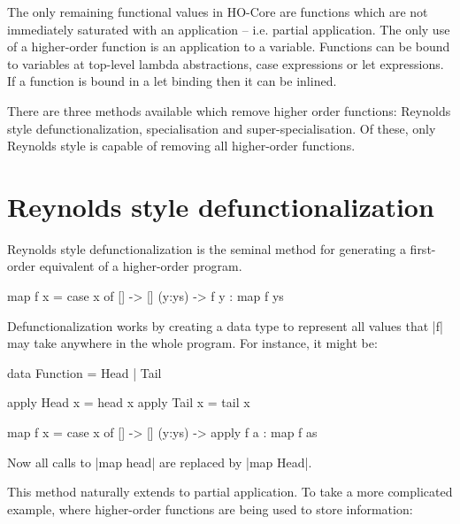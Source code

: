 The only remaining functional values in HO-Core are functions which are not immediately saturated with an application -- i.e. partial application. The only use of a higher-order function is an application to a variable. Functions can be bound to variables at top-level lambda abstractions, case expressions or let expressions. If a function is bound in a let binding then it can be inlined.

There are three methods available which remove higher order functions: Reynolds style defunctionalization, specialisation and super-specialisation. Of these, only Reynolds style is capable of removing all higher-order functions.

\section{Reynolds style defunctionalization}

Reynolds style defunctionalization \cite{reynolds:defunc} is the seminal method for generating a first-order equivalent of a higher-order program.

\begin{example}
\begin{code}
map f x = case  x of
                []      -> []
                (y:ys)  -> f y : map f ys
\end{code}

\noindent Defunctionalization works by creating a data type to represent all values that |f| may take anywhere in the whole program. For instance, it might be:

\ignore\begin{code}
data Function = Head | Tail

apply Head  x = head  x
apply Tail  x = tail  x

map f x = case  x of
                 []      -> []
                 (y:ys)  -> apply f a : map f as
\end{code}

\noindent Now all calls to |map head| are replaced by |map Head|.
\end{example}

This method naturally extends to partial application. To take a more complicated example, where higher-order functions are being used to store information:

